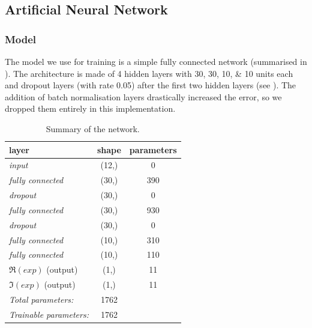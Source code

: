 \subsection{Artificial Neural Network}

\subsubsection{Model}

The model we use for training is a simple fully connected network (summarised in ).
The architecture is made of 4 hidden layers with \numlist{30;30;10;10} units each and dropout layers (with rate \num{0.05}) after the first two hidden layers (see ).
The addition of batch normalisation layers drastically increased the error, so we dropped them entirely in this implementation.

\begin{table}[htbp]
  \centering
  \begin{tabular}{@{}lcc@{}}
    \toprule
    \textbf{layer}           & \textbf{shape} & \textbf{parameters} \\
    \midrule
    \emph{input}             & (12,)          & 0                   \\
    \emph{fully connected}   & (30,)          & 390                 \\
    \emph{dropout}           & (30,)          & 0                   \\
    \emph{fully connected}   & (30,)          & 930                 \\
    \emph{dropout}           & (30,)          & 0                   \\
    \emph{fully connected}   & (10,)          & 310                 \\
    \emph{fully connected}   & (10,)          & 110                 \\
    $\Re(exp)$ (output)      & (1,)           & 11                  \\
    $\Im(exp)$ (output)      & (1,)           & 11                  \\
    \midrule
    \emph{Total parameters:}     & \num{1762}     &                 \\
    \emph{Trainable parameters:} & \num{1762}     &                 \\
    \bottomrule
  \end{tabular}
  \caption{Summary of the network.}
  \label{tab:agg:keras_summary}
\end{table}

